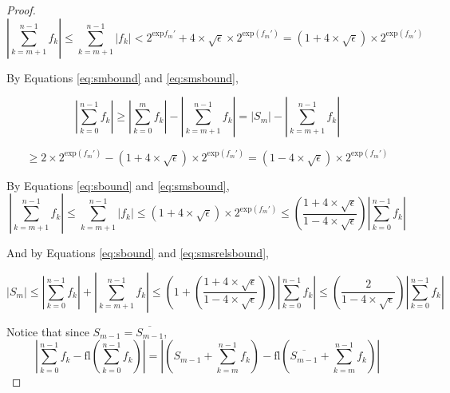 \documentclass[12pt]{article}
\providecommand{\exp}{\ensuremath{\text{exp}}}
\providecommand{\fl}{\ensuremath{\text{fl}}}
\theoremstyle{definition}
\numberwithin{equation}{section}
\begin{document}
\begin{proof}
      \begin{equation}
        |\sum\limits_{k = m + 1}^{n - 1} f_k| \leq \sum\limits_{k = m + 1}^{n - 1} |f_k| < 2^{\exp{f_m'}} + 4 \times \sqrt\epsilon \times 2^{\exp(f_m')} = (1 + 4 \times \sqrt\epsilon )\times 2^{\exp(f_m')}
        \label{eq:smsbound}
      \end{equation}

      By Equations \ref{eq:smbound} and \ref{eq:smsbound},

      \begin{equation*}
        |\sum\limits_{k = 0}^{n - 1} f_k| \geq |\sum\limits_{k = 0}^{m} f_k| - |\sum\limits_{k = m + 1}^{n - 1} f_k| = |S_m| - |\sum\limits_{k = m + 1}^{n - 1} f_k|
      \end{equation*}

      \begin{equation}
        \geq 2 \times 2^{\exp(f_{m}')} - (1 + 4 \times \sqrt\epsilon)\times 2^{\exp(f_m')} = (1 - 4 \times \sqrt\epsilon)\times 2^{\exp(f_m')}
        \label{eq:sbound}
      \end{equation}

      By Equations \ref{eq:sbound} and \ref{eq:smsbound},
      \begin{equation}
        |\sum\limits_{k = m + 1}^{n - 1}f_k| \leq \sum\limits_{k = m + 1}^{n - 1}|f_k| \leq (1 + 4 \times \sqrt\epsilon)\times2^{\exp(f_m')}\leq (\frac{1 + 4 \times \sqrt\epsilon}{1 - 4 \times \sqrt\epsilon})|\sum\limits_{k = 0}^{n - 1}f_k|
        \label{eq:smsrelsbound}
      \end{equation}

      And by Equations \ref{eq:sbound} and \ref{eq:smsrelsbound},

      \begin{equation}
        |S_m| \leq |\sum\limits_{k = 0}^{n - 1}f_k| + |\sum\limits_{k = m + 1}^{n - 1} f_k| \leq (1 + (\frac{1 + 4 \times \sqrt\epsilon}{1 - 4 \times \sqrt\epsilon}))|\sum\limits_{k = 0}^{n - 1}f_k| \leq (\frac{2}{1 - 4 \times \sqrt\epsilon})|\sum\limits_{k = 0}^{n - 1}f_k|
        \label{eq:smrelsbound}
      \end{equation}

      Notice that since $S_{m - 1} = \overline{S_{m - 1}}$,
      \begin{equation*}
        |\sum \limits_{k = 0}^{n - 1} f_k - \fl(\sum \limits_{k = 0}^{n - 1} f_k)| = |(S_{m - 1} + \sum \limits_{k = m}^{n - 1} f_k) - \fl(\overline{S_{m - 1}} + \sum \limits_{k = m}^{n - 1} f_k)|
      \end{equation*}


\end{proof}
\end{document}
